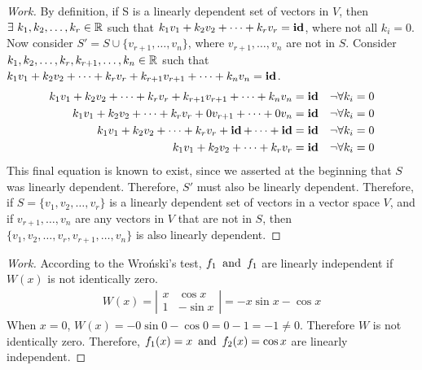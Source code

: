 \documentclass{article}
\begin{document}
\begin{proof}[Work]
    By definition, if S is a linearly dependent set of vectors in $V$, then $\exists~ k_1,k_2,\ldots,k_r \in \mathbb{R}$ such that $k_1v_1 + k_2v_2 + \cdots + k_rv_r = \operatorname{\textbf{id}}$, where not all $k_i = 0$. Now consider $S' = S \cup \{v_{r+1},\ldots,v_n\}$, where $v_{r+1},\ldots,v_n$ are not in $S$. Consider $k_1,k_2,\ldots,k_r,k_{r+1},\ldots,k_n \in \mathbb{R}$ such that $k_1v_1 + k_2v_2 + \cdots + k_rv_r + k_{r+1}v_{r+1} + \cdots + k_nv_n = \operatorname{\textbf{id}}$.
    \begin{align*}
        k_1v_1 + k_2v_2 + \cdots + k_rv_r + k_{r+1}v_{r+1} + \cdots + k_nv_n & = \operatorname{\textbf{id}} &  & \lnot \forall k_i = 0 \\
        k_1v_1 + k_2v_2 + \cdots + k_rv_r + 0v_{r+1} + \cdots + 0v_n         & = \operatorname{\textbf{id}} &  & \lnot \forall k_i = 0 \\
        k_1v_1 + k_2v_2 + \cdots + k_rv_r + \operatorname{\textbf{id}} + \cdots + \operatorname{\textbf{id}}               & = \operatorname{\textbf{id}} &  & \lnot \forall k_i = 0 \\
        k_1v_1 + k_2v_2 + \cdots + k_rv_r                                    & = \operatorname{\textbf{id}} &  & \lnot \forall k_i = 0 \\
    \end{align*}
    This final equation is known to exist, since we asserted at the beginning that $S$ was linearly dependent. Therefore, $S'$ must also be linearly dependent. Therefore, if $S = \{v_1,v_2,\ldots,v_r\}$ is a linearly dependent set of vectors in a vector space $V$, and if $v_{r+1},\ldots,v_n$ are any vectors in $V$ that are not in $S$, then $\{v_1,v_2,\ldots,v_r,v_{r+1},\ldots,v_n\}$ is also linearly dependent.
\end{proof}
\qdash

\begin{proof}[Work]
    According to the Wroński's test, $f_1 \operatorname{~\text{and}~} f_1$ are linearly independent if $W(x)$ is not identically zero.
    \begin{align*}
        W(x) = \left\lvert \begin{array}{cc}
                               x & \cos x  \\
                               1 & -\sin x
                           \end{array}\right\rvert = -x\sin x - \cos x
    \end{align*}
    When $x = 0$, $W(x) = -0\sin 0 - \cos 0 = 0 - 1 = -1 \neq 0$. Therefore $W$ is not identically zero. Therefore, $f_1(x) = x \operatorname{~\text{and}~} f_2(x) = \cos x$ are linearly independent.
\end{proof}
\qdash
\end{document}
